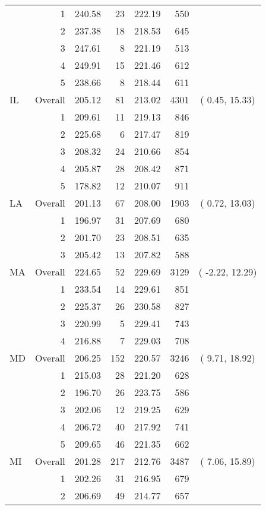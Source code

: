\begin{longtable}{lrrr@{\extracolsep{.25cm}}rrc}
   & 1 & 240.58 &  23 & 222.19 & 550 &  \\ 
   & 2 & 237.38 &  18 & 218.53 & 645 &  \\ 
   & 3 & 247.61 &   8 & 221.19 & 513 &  \\ 
   & 4 & 249.91 &  15 & 221.46 & 612 &  \\ 
   & 5 & 238.66 &   8 & 218.44 & 611 &  \\ 
   \hline
IL & Overall & 205.12 &  81 & 213.02 & 4301 & (  0.45,  15.33) \\ 
   & 1 & 209.61 &  11 & 219.13 & 846 &  \\ 
   & 2 & 225.68 &   6 & 217.47 & 819 &  \\ 
   & 3 & 208.32 &  24 & 210.66 & 854 &  \\ 
   & 4 & 205.87 &  28 & 208.42 & 871 &  \\ 
   & 5 & 178.82 &  12 & 210.07 & 911 &  \\ 
   \hline
LA & Overall & 201.13 &  67 & 208.00 & 1903 & (  0.72,  13.03) \\ 
   & 1 & 196.97 &  31 & 207.69 & 680 &  \\ 
   & 2 & 201.70 &  23 & 208.51 & 635 &  \\ 
   & 3 & 205.42 &  13 & 207.82 & 588 &  \\ 
   \hline
MA & Overall & 224.65 &  52 & 229.69 & 3129 & ( -2.22,  12.29) \\ 
   & 1 & 233.54 &  14 & 229.61 & 851 &  \\ 
   & 2 & 225.37 &  26 & 230.58 & 827 &  \\ 
   & 3 & 220.99 &   5 & 229.41 & 743 &  \\ 
   & 4 & 216.88 &   7 & 229.03 & 708 &  \\ 
   \hline
MD & Overall & 206.25 & 152 & 220.57 & 3246 & (  9.71,  18.92) \\ 
   & 1 & 215.03 &  28 & 221.20 & 628 &  \\ 
   & 2 & 196.70 &  26 & 223.75 & 586 &  \\ 
   & 3 & 202.06 &  12 & 219.25 & 629 &  \\ 
   & 4 & 206.72 &  40 & 217.92 & 741 &  \\ 
   & 5 & 209.65 &  46 & 221.35 & 662 &  \\ 
   \hline
MI & Overall & 201.28 & 217 & 212.76 & 3487 & (  7.06,  15.89) \\ 
   & 1 & 202.26 &  31 & 216.95 & 679 &  \\ 
   & 2 & 206.69 &  49 & 214.77 & 657 &  \\ 

\end{longtable}
